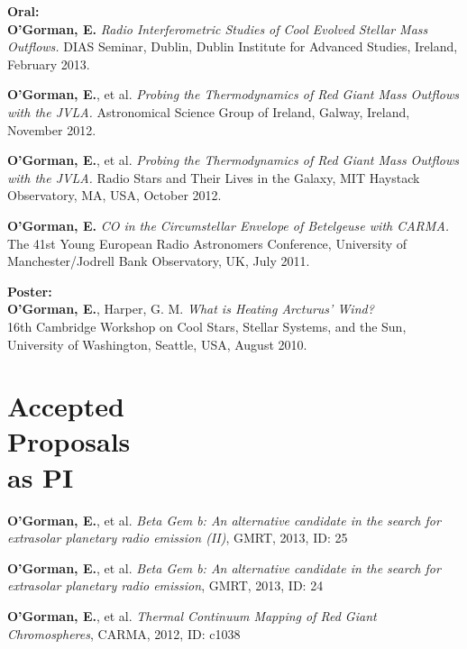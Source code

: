 \documentclass[margin,line]{resume}
\begin{document}
\begin{resume}
    \textbf{Oral:} \vspace{2mm}\\\vspace{1mm}%
\textbf{O'Gorman, E.} \textit{Radio Interferometric Studies of Cool Evolved Stellar Mass Outflows.}
DIAS Seminar, Dublin, Dublin Institute for Advanced Studies, Ireland, February 2013. %
    
	\textbf{O'Gorman, E.}, et al. \textit{Probing the Thermodynamics of Red Giant Mass Outflows with the JVLA.}
Astronomical Science Group of Ireland, Galway, Ireland, November 2012. %
    
\textbf{O'Gorman, E.}, et al. \textit{Probing the Thermodynamics of Red Giant Mass Outflows with the JVLA.}
Radio Stars and Their Lives in the Galaxy, MIT Haystack Observatory, MA, USA, October 2012. %

\textbf{O'Gorman, E.} \textit{CO in the Circumstellar Envelope of Betelgeuse with CARMA.}
The 41st Young European Radio Astronomers Conference, University of Manchester/Jodrell Bank Observatory, UK, July 2011.

    \textbf{Poster:} \vspace{2mm}\\\vspace{1mm}%
    \textbf{O'Gorman, E.}, Harper, G. M. \textit{What is Heating Arcturus' Wind?}\\
16th Cambridge Workshop on Cool Stars, Stellar Systems, and the Sun, University of Washington, Seattle, USA, August 2010.


    \vspace{2mm}
    \section{\mysidestyle Accepted\\Proposals\\as PI}

\textbf{O'Gorman, E.}, et al. \textit{Beta Gem b: An alternative candidate in the search for extrasolar planetary radio emission (II)}, GMRT, 2013, ID: 25%

\textbf{O'Gorman, E.}, et al. \textit{Beta Gem b: An alternative candidate in the search for extrasolar planetary radio emission}, GMRT, 2013, ID: 24%

\textbf{O'Gorman, E.}, et al. \textit{Thermal Continuum Mapping of Red Giant Chromospheres}, CARMA, 2012, ID: c1038%


\end{resume}
\end{document}
